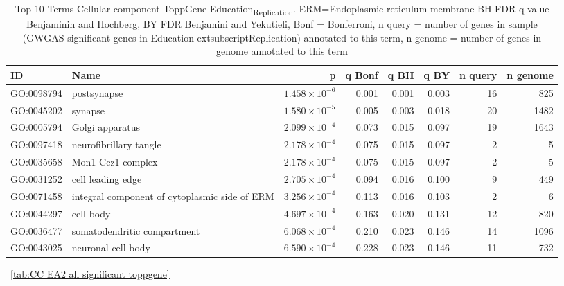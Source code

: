 \begin{table}[ht]
\centering
\begin{adjustbox}{width=\textwidth}
\begin{tabular}{llrrrrrr}
  \hline
ID & Name & p & q Bonf & q BH & q BY & n query & n genome \\ 
  \hline
GO:0098794 & postsynapse & $1.458 \times 10^{-6}$ & 0.001 & 0.001 & 0.003 & 16 & 825 \\ 
  GO:0045202 & synapse & $1.580 \times 10^{-5}$ & 0.005 & 0.003 & 0.018 & 20 & 1482 \\ 
  GO:0005794 & Golgi apparatus & $2.099 \times 10^{-4}$ & 0.073 & 0.015 & 0.097 & 19 & 1643 \\ 
  GO:0097418 & neurofibrillary tangle & $2.178 \times 10^{-4}$ & 0.075 & 0.015 & 0.097 & 2 & 5 \\ 
  GO:0035658 & Mon1-Ccz1 complex & $2.178 \times 10^{-4}$ & 0.075 & 0.015 & 0.097 & 2 & 5 \\ 
  GO:0031252 & cell leading edge & $2.705 \times 10^{-4}$ & 0.094 & 0.016 & 0.100 & 9 & 449 \\ 
  GO:0071458 & integral component of cytoplasmic side of ERM & $3.256 \times 10^{-4}$ & 0.113 & 0.016 & 0.103 & 2 & 6 \\ 
  GO:0044297 & cell body & $4.697 \times 10^{-4}$ & 0.163 & 0.020 & 0.131 & 12 & 820 \\ 
  GO:0036477 & somatodendritic compartment & $6.068 \times 10^{-4}$ & 0.210 & 0.023 & 0.146 & 14 & 1096 \\ 
  GO:0043025 & neuronal cell body & $6.590 \times 10^{-4}$ & 0.228 & 0.023 & 0.146 & 11 & 732 \\ 
   \hline
\end{tabular}
\end{adjustbox}
\caption{ Top 10 Terms Cellular component ToppGene Education\textsubscript{Replication}. ERM=Endoplasmic reticulum membrane BH FDR q value Benjaminin and Hochberg, BY FDR Benjamini and Yekutieli, Bonf = Bonferroni, n query = number of genes in sample (GWGAS significant genes in Education	extsubscript{Replication}) annotated to this term, n genome = number of genes in genome annotated to this term} 
~\ref{tab:CC EA2 all significant toppgene}
\end{table}
